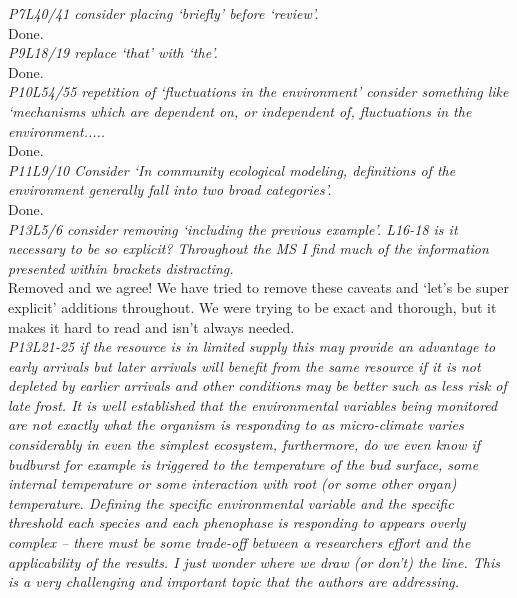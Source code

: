 \documentclass[11pt]{article}
\begin{document}
\emph{P7L40/41 consider placing `briefly' before `review'.}\\

Done.\\

\emph{P9L18/19 replace `that' with `the'.}\\

Done.\\

\emph{P10L54/55 repetition of `fluctuations in the environment' consider something like `mechanisms
which are dependent on, or independent of, fluctuations in the environment.....}\\

Done.\\

\emph{P11L9/10 Consider `In community ecological modeling, definitions of the environment generally
fall into two broad categories'.}\\

Done.\\

\emph{P13L5/6 consider removing `including the previous example'. L16-18 is it necessary to be so
explicit? Throughout the MS I find much of the information presented within brackets
distracting. }\\

Removed and we agree! We have tried to remove these caveats and `let's be super explicit' additions throughout. We were trying to be exact and thorough, but it makes it hard to read and isn't always needed.\\

\emph{P13L21-25 if the resource is in limited supply this may provide an advantage to
early arrivals but later arrivals will benefit from the same resource if it is not depleted
by earlier arrivals and other conditions may be better such as less risk of late frost.
It is well established that the environmental variables being monitored are not exactly what
the organism is responding to as micro-climate varies considerably in even the simplest
ecosystem, furthermore, do we even know if budburst for example is triggered to the
temperature of the bud surface, some internal temperature or some interaction with root (or
some other organ) temperature. Defining the specific environmental variable and the specific
threshold each species and each phenophase is responding to appears overly complex – there
must be some trade-off between a researchers effort and the applicability of the results. I
just wonder where we draw (or don't) the line. This is a very challenging and important topic
that the authors are addressing.}\\
\end{document}
